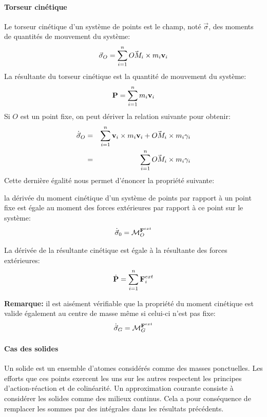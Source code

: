 \paragraph{Torseur cinétique}

Le torseur cinétique d'un système de points est le champ, noté $\vec{\sigma}$, des
moments de quantités de mouvement du système:
$$
\vec{\sigma}_{O} = \sum_{i=1}^n \vec{OM_i} \crossprod m_i \vi
$$
La résultante du torseur cinétique est la quantité de mouvement du
système:
$$
\vect{P} = \sum_{i=1}^n m_i \vi
$$
Si $O$ est un point fixe, on peut dériver la relation suivante
pour obtenir:
\begin{eqnarray*}
  \dot{\vec{\sigma}}_O &=& \sum_{i=1}^n \vi \crossprod m_i \vi + \vec{OM_i}
  \crossprod m_i \gammai \\
  &=& \sum_{i=1}^n \vec{OM_i} \crossprod m_i \gammai
\end{eqnarray*}
Cette dernière égalité nous permet d'énoncer la propriété suivante:
\begin{property}
  la dérivée du moment cinétique d'un système de points par rapport à un
  point fixe est égale au
  moment des forces extérieures par rapport à ce point sur le système:
  \begin{equation}\label{eq:newton3}
    \dot{\vec{\sigma}}_0 = \moment{\vect{F}^{ext}}{O}
  \end{equation}

  La dérivée de la résultante cinétique est égale à la résultante des
  forces extérieures:
  \begin{equation}\label{eq:newton2}
    \dot{\vect{P}} = \sum_{i=1}^n \vect{F}_i^{ext}
  \end{equation}

\end{property}

\textbf{Remarque:} il est aisément vérifiable que la propriété du
moment cinétique est valide également au centre de masse même si
celui-ci n'est pas fixe:
$$
\dot{\vec{\sigma}}_G = \moment{\vect{F}^{ext}}{G}
$$

\paragraph{Cas des solides}

Un solide est un ensemble d'atomes considérés comme des masses
ponctuelles. Les efforts que ces points exercent les uns sur les
autres respectent les principes d'action-réaction et de colinéarité.
Un approximation courante consiste à considérer les solides comme des milieux
continus. Cela a pour conséquence de remplacer les sommes par des
intégrales dans les résultats précédents.

